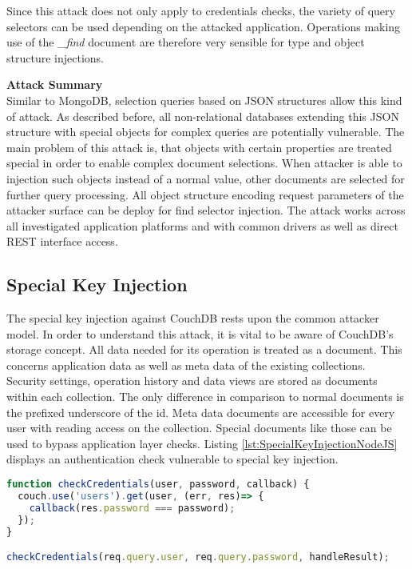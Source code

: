 Since this attack does not only apply to credentials checks, the variety of query selectors can be used depending on the attacked application. Operations making use of the \emph{\_find} document are therefore very sensible for type and object structure injections.

\textbf{Attack Summary} \\
Similar to MongoDB, selection queries based on JSON structures allow this kind of attack. As described before, all non-relational databases extending this JSON structure with special objects for complex queries are potentially vulnerable. The main problem of this attack is, that objects with certain properties are treated special in order to enable complex document selections. When attacker is able to injection such objects instead of a normal value, other documents are selected for further query processing. All object structure encoding request parameters of the attacker surface can be deploy for find selector injection. The attack works across all investigated application platforms and with common drivers as well as direct REST interface access. 

\subsection{Special Key Injection}
The special key injection against CouchDB rests upon the common attacker model. In order to understand this attack, it is vital to be aware of CouchDB's storage concept. All data needed for its operation is treated as a document. This concerns application data as well as meta data of the existing collections. Security settings, operation history and data views are stored as documents within each collection. The only difference in comparison to normal documents is the prefixed underscore of the id. Meta data documents are accessible for every user with reading access on the collection. Special documents like those can be used to bypass application layer checks. Listing \ref{lst:SpecialKeyInjectionNodeJS} displays an authentication check vulnerable to special key injection. \\

\begin{lstlisting}[caption={Vulnerable NodeJS example for special key injection on CouchDB}, label={lst:SpecialKeyInjectionNodeJS}, language=JavaScript]
function checkCredentials(user, password, callback) {
  couch.use('users').get(user, (err, res)=> {
    callback(res.password === password);
  });
}

checkCredentials(req.query.user, req.query.password, handleResult);
\end{lstlisting}


